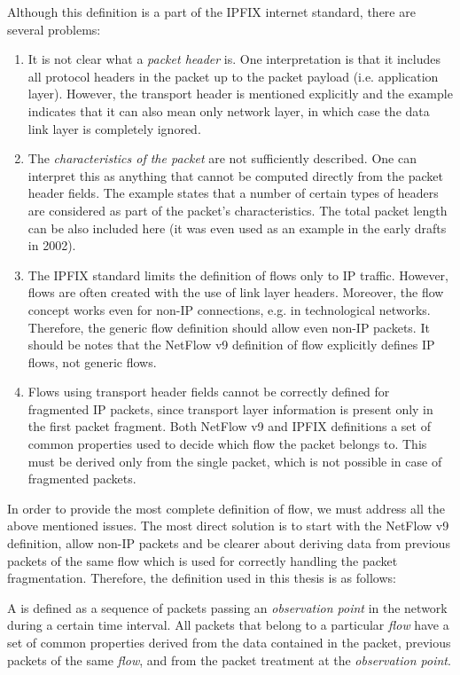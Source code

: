 Although this definition is a part of the IPFIX internet standard, there are several problems:
\begin{enumerate}
    \item It is not clear what a \emph{packet header} is. One interpretation is that it includes all protocol headers in the packet up to the packet payload (i.e. application layer). However, the transport header is mentioned explicitly and the example indicates that it can also mean only network layer, in which case the data link layer is completely ignored.
    \item The \emph{characteristics of the packet} are not sufficiently described. One can interpret this as anything that cannot be computed directly from the packet header fields. The example states that a number of certain types of headers are considered as part of the packet's characteristics. The total packet length can be also included here (it was even used as an example in the early drafts in 2002).
    \item The IPFIX standard limits the definition of flows only to IP traffic. 
    However, flows are often created with the use of link layer headers. Moreover, the flow concept works even for non-IP connections, e.g. in technological networks. Therefore, the generic flow definition should allow even non-IP packets. It should be notes that the NetFlow v9 definition of flow explicitly defines IP flows, not generic flows.
    \item Flows using transport header fields cannot be correctly defined for fragmented IP packets, since transport layer information is present only in the first packet fragment. Both NetFlow v9 and IPFIX definitions a set of common properties used to decide which flow the packet belongs to. This must be derived only from the single packet, which is not possible in case of fragmented packets.
\end{enumerate}

In order to provide the most complete definition of flow, we must address all the above mentioned issues. The most direct solution is to start with the NetFlow v9 definition, allow non-IP packets and be clearer about deriving data from previous packets of the same flow which is used for correctly handling the packet fragmentation. Therefore, the definition used in this thesis is as follows:

\begin{definition}\label{def:flow}

    A \emph{} is defined as a sequence of packets passing an \emph{observation point}
    in the network during a certain time interval. All packets that belong
    to a particular \emph{flow} have a set of common properties derived from
    the data contained in the packet, previous packets of the same \emph{flow},
    and from the packet treatment at the \emph{observation point}.

\end{definition}

